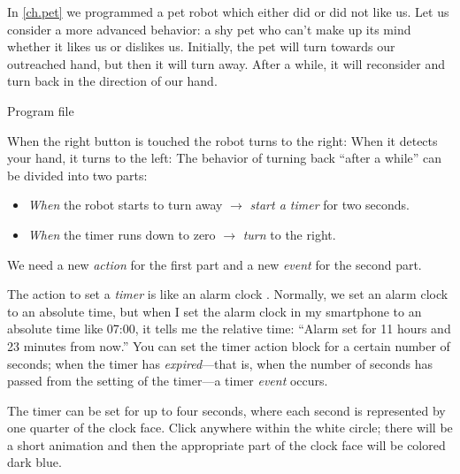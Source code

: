 \label{ch.time}

In \cref{ch.pet} we programmed a pet robot which either did or did not
like us. Let us consider a more advanced behavior: a shy pet who can't
make up its mind whether it likes us or dislikes us. Initially, the pet
will turn towards our outreached hand, but then it will turn away. After
a while, it will reconsider and turn back in the direction of our hand.

{\raggedleft \hfill Program file }

When the right button is touched the robot turns to the right:
 When it detects your hand, it turns to the left:
 The behavior of turning back ``after a while'' can be
divided into two parts:

\begin{itemize}

\item \emph{When} the robot starts to turn away $\rightarrow$
\emph{start a timer} for two seconds.

\item \emph{When} the timer runs down to zero $\rightarrow$ \emph{turn}
to the right.

\end{itemize}

We need a new \emph{action} for the first part and a new \emph{event}
for the second part.

The action to set a \emph{timer} is like an alarm clock
. Normally, we set an alarm clock to an absolute
time, but when I set the alarm clock in my smartphone to an absolute
time like 07:00, it tells me the relative time: ``Alarm set for 11 hours
and 23 minutes from now.'' You can set the timer action block for a
certain number of seconds; when the timer has \emph{expired}---that is,
when the number of seconds has passed from the setting of the timer---a
timer \emph{event} occurs.

The timer can be set for up to four seconds, where each second is
represented by one quarter of the clock face. Click anywhere within the
white circle; there will be a short animation and then the appropriate
part of the clock face will be colored dark blue.


